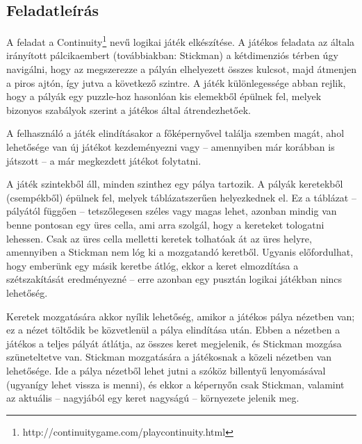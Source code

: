 \subsection{Feladatleírás}

	A feladat a Continuity\footnote{http://continuitygame.com/playcontinuity.html} nevű logikai játék elkészítése. A játékos feladata az általa irányított pálcikaembert (továbbiakban: Stickman) a kétdimenziós térben úgy navigálni, hogy az megszerezze a pályán elhelyezett összes kulcsot, majd átmenjen a piros ajtón, így jutva a következő szintre. A játék különlegessége abban rejlik, hogy a pályák egy puzzle-hoz hasonlóan kis elemekből épülnek fel, melyek bizonyos szabályok szerint a játékos által átrendezhetőek.
	
	A felhasználó a játék elindításakor a főképernyővel találja szemben magát, ahol lehetősége van új játékot kezdeményezni vagy -- amennyiben már korábban is játszott -- a már megkezdett játékot folytatni.
	
	A játék szintekből áll, minden szinthez egy pálya tartozik. A pályák keretekből (csempékből) épülnek fel, melyek táblázatszerűen helyezkednek el. Ez a táblázat -- pályától függően -- tetszőlegesen széles vagy magas lehet, azonban mindig van benne pontosan egy üres cella, ami arra szolgál, hogy a kereteket tologatni lehessen. Csak az üres cella melletti keretek tolhatóak át az üres helyre, amennyiben a Stickman nem lóg ki a mozgatandó keretből. Ugyanis előfordulhat, hogy emberünk egy másik keretbe átlóg, ekkor a keret elmozdítása a szétszakítását eredményezné -- erre azonban egy pusztán logikai játékban nincs lehetőség.
	
	
	Keretek mozgatására akkor nyílik lehetőség, amikor a játékos pálya nézetben van; ez a nézet töltődik be közvetlenül a pálya elindítása után. Ebben a nézetben a játékos a teljes pályát átlátja, az összes keret megjelenik, és Stickman mozgása szüneteltetve van.
Stickman mozgatására a játékosnak a közeli nézetben van lehetősége. Ide a pálya nézetből lehet jutni a szóköz billentyű lenyomásával (ugyanígy lehet vissza is menni), és ekkor a képernyőn csak Stickman, valamint az aktuális -- nagyjából egy keret nagyságú -- környezete jelenik meg.
	
